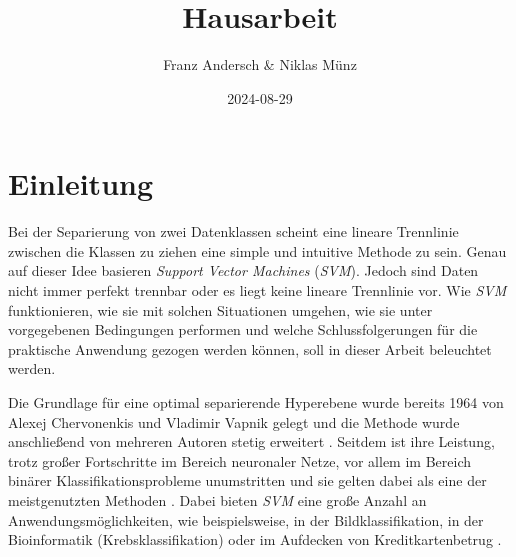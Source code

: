 \documentclass[
]{article}
\title{Hausarbeit}
\author{Franz Andersch \& Niklas Münz}
\date{2024-08-29}
\renewcommand{\maketitle}{}
\begin{document}
\maketitle


\newpage
\tableofcontents
\thispagestyle{empty}
\clearpage
{}
\section{Einleitung}

Bei der Separierung von zwei Datenklassen scheint eine lineare
Trennlinie zwischen die Klassen zu ziehen eine simple und intuitive
Methode zu sein. Genau auf dieser Idee basieren
\textit{Support Vector Machines} (\textit{SVM}). Jedoch sind Daten nicht
immer perfekt trennbar oder es liegt keine lineare Trennlinie vor. Wie
\textit{SVM} funktionieren, wie sie mit solchen Situationen umgehen, wie
sie unter vorgegebenen Bedingungen performen und welche
Schlussfolgerungen für die praktische Anwendung gezogen werden können,
soll in dieser Arbeit beleuchtet werden.

Die Grundlage für eine optimal separierende Hyperebene wurde bereits
1964 von Alexej Chervonenkis und Vladimir Vapnik gelegt und die Methode
wurde anschließend von mehreren Autoren stetig erweitert
\parencite{vapnikEstimationDependencesBased2006}. Seitdem ist ihre
Leistung, trotz großer Fortschritte im Bereich neuronaler Netze, vor
allem im Bereich binärer Klassifikationsprobleme unumstritten und sie
gelten dabei als eine der meistgenutzten Methoden
\parencite{soofiClassificationTechniquesMachine2017}. Dabei bieten
\textit{SVM} eine große Anzahl an Anwendungsmöglichkeiten, wie
beispielsweise, in der Bildklassifikation, in der Bioinformatik
(Krebsklassifikation) oder im Aufdecken von Kreditkartenbetrug
\parencite{cervantesComprehensiveSurveySupport2020}.
\end{document}
